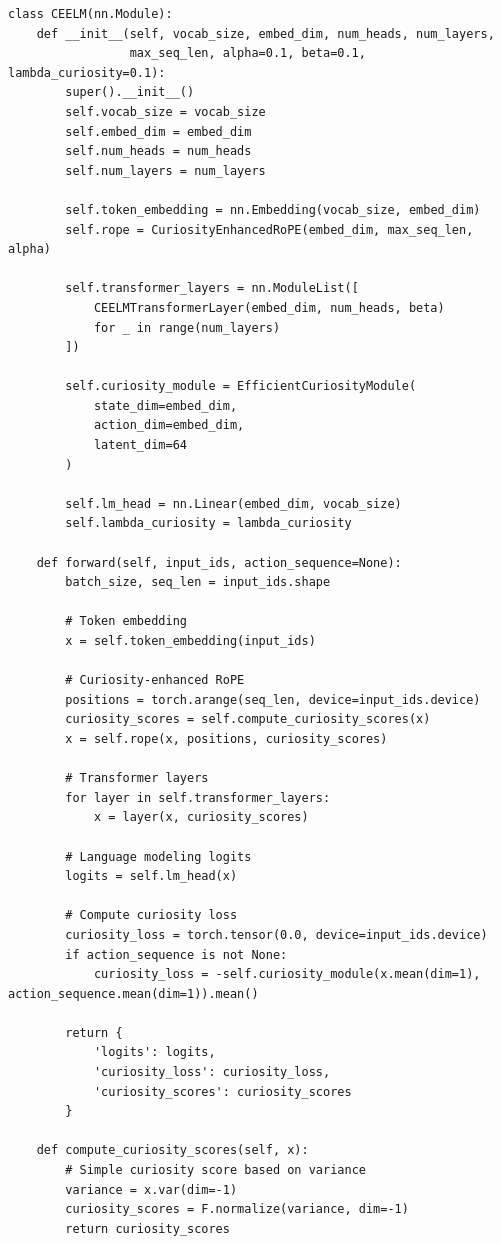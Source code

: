 \documentclass{IEEEtran}
\begin{document}
\begin{verbatim}
class CEELM(nn.Module):
    def __init__(self, vocab_size, embed_dim, num_heads, num_layers, 
                 max_seq_len, alpha=0.1, beta=0.1, lambda_curiosity=0.1):
        super().__init__()
        self.vocab_size = vocab_size
        self.embed_dim = embed_dim
        self.num_heads = num_heads
        self.num_layers = num_layers
        
        self.token_embedding = nn.Embedding(vocab_size, embed_dim)
        self.rope = CuriosityEnhancedRoPE(embed_dim, max_seq_len, alpha)
        
        self.transformer_layers = nn.ModuleList([
            CEELMTransformerLayer(embed_dim, num_heads, beta)
            for _ in range(num_layers)
        ])
        
        self.curiosity_module = EfficientCuriosityModule(
            state_dim=embed_dim,
            action_dim=embed_dim,
            latent_dim=64
        )
        
        self.lm_head = nn.Linear(embed_dim, vocab_size)
        self.lambda_curiosity = lambda_curiosity
    
    def forward(self, input_ids, action_sequence=None):
        batch_size, seq_len = input_ids.shape
        
        # Token embedding
        x = self.token_embedding(input_ids)
        
        # Curiosity-enhanced RoPE
        positions = torch.arange(seq_len, device=input_ids.device)
        curiosity_scores = self.compute_curiosity_scores(x)
        x = self.rope(x, positions, curiosity_scores)
        
        # Transformer layers
        for layer in self.transformer_layers:
            x = layer(x, curiosity_scores)
        
        # Language modeling logits
        logits = self.lm_head(x)
        
        # Compute curiosity loss
        curiosity_loss = torch.tensor(0.0, device=input_ids.device)
        if action_sequence is not None:
            curiosity_loss = -self.curiosity_module(x.mean(dim=1), action_sequence.mean(dim=1)).mean()
        
        return {
            'logits': logits,
            'curiosity_loss': curiosity_loss,
            'curiosity_scores': curiosity_scores
        }
    
    def compute_curiosity_scores(self, x):
        # Simple curiosity score based on variance
        variance = x.var(dim=-1)
        curiosity_scores = F.normalize(variance, dim=-1)
        return curiosity_scores
\end{verbatim}
\end{document}

